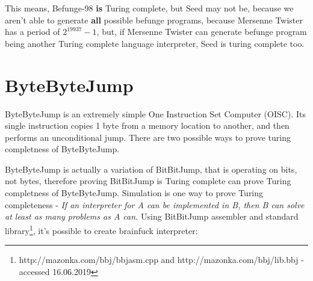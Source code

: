 \documentclass{article}
\begin{document}
\par This means, Befunge-98 \textbf{is} Turing complete, but Seed may not be, because we aren't able to generate \textbf{all} possible befunge programs, because Mersenne Twister has a period of \begin{math}2^{19937} - 1\end{math}, but, if Mersenne Twister can generate befunge program being another Turing complete language interpreter, Seed is turing complete too.

\section{ByteByteJump}
\par ByteByteJump is an extremely simple One Instruction Set Computer (OISC). Its single instruction copies 1 byte from a memory location to another, and then performs an unconditional jump. There are two possible ways to prove turing completness of ByteByteJump.

\par ByteByteJump is actually a variation of BitBitJump, that is operating on bits, not bytes, therefore proving BitBitJump is Turing complete can prove Turing completness of ByteByteJump. Simulation is one way to prove Turing completeness - \textit{If an interpreter for A can be implemented in B, then B can solve at least as many problems as A can.}
Using BitBitJump assembler and standard library\footnote{http://mazonka.com/bbj/bbjasm.cpp and http://mazonka.com/bbj/lib.bbj - accessed 16.06.2019}, it's possible to create brainfuck interpreter:
\end{document}
